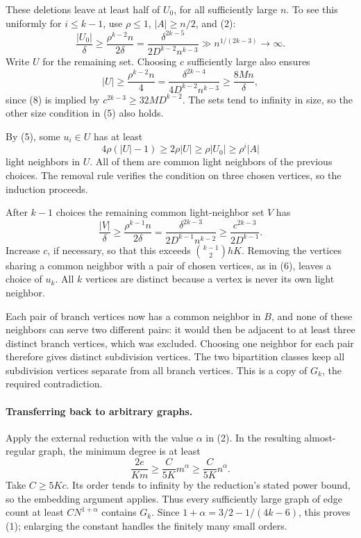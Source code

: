 These deletions leave at least half of \(U_0\), for all sufficiently large \(n\). To see this uniformly for \(i\leq k-1\), use \(\rho\leq1\), \(|A|\geq n/2\), and (2):
\[
 \frac{|U_0|}{\delta}
 \geq\frac{\rho^{k-2}n}{2\delta}
 =\frac{\delta^{2k-5}}{2D^{k-2}n^{k-3}}
 \gg n^{1/(2k-3)}\longrightarrow\infty. \tag{7}
\]
Write \(U\) for the remaining set. Choosing \(c\) sufficiently large also ensures
\[
 |U|\geq\frac{\rho^{k-2}n}{4}
 =\frac{\delta^{2k-4}}{4D^{k-2}n^{k-3}}
 \geq\frac{8Mn}{\delta}, \tag{8}
\]
since (8) is implied by
\(c^{2k-3}\geq32M D^{k-2}\).
The sets tend to infinity in size, so the other size condition in (5) also holds.

By (5), some \(u_i\in U\) has at least
\[
 4\rho(|U|-1)\geq2\rho|U|
 \geq\rho|U_0|\geq\rho^i|A|
\]
light neighbors in \(U\). All of them are common light neighbors of the previous choices. The removal rule verifies the condition on three chosen vertices, so the induction proceeds.

After \(k-1\) choices the remaining common light-neighbor set \(V\) has
\[
 \frac{|V|}{\delta}
 \geq\frac{\rho^{k-1}n}{2\delta}
 =\frac{\delta^{2k-3}}{2D^{k-1}n^{k-2}}
 \geq\frac{c^{2k-3}}{2D^{k-1}}.
\]
Increase \(c\), if necessary, so that this exceeds \(\binom{k-1}{2}hK\). Removing the vertices sharing a common neighbor with a pair of chosen vertices, as in (6), leaves a choice of \(u_k\). All \(k\) vertices are distinct because a vertex is never its own light neighbor.

Each pair of branch vertices now has a common neighbor in \(B\), and none of these neighbors can serve two different pairs: it would then be adjacent to at least three distinct branch vertices, which was excluded. Choosing one neighbor for each pair therefore gives distinct subdivision vertices. The two bipartition classes keep all subdivision vertices separate from all branch vertices. This is a copy of \(G_k\), the required contradiction.

\paragraph{Transferring back to arbitrary graphs.}
Apply the external reduction with the value \(\alpha\) in (2). In the resulting almost-regular graph, the minimum degree is at least
\[
 \frac{2e}{Km}\geq\frac{C}{5K}m^\alpha
 \geq\frac{C}{5K}n^\alpha.
\]
Take \(C\geq5Kc\). Its order tends to infinity by the reduction's stated power bound, so the embedding argument applies. Thus every sufficiently large graph of edge count at least \(CN^{1+\alpha}\) contains \(G_k\). Since
\(1+\alpha=3/2-1/(4k-6)\), this proves (1); enlarging the constant handles the finitely many small orders.

